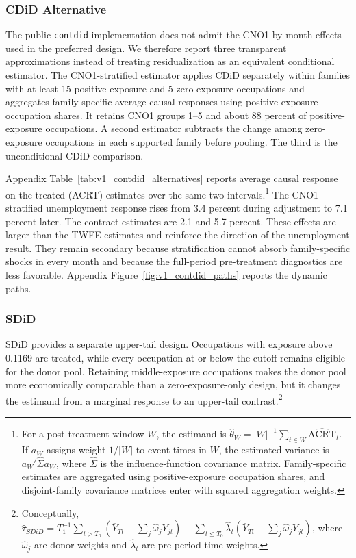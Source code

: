 \documentclass[11pt]{article}
\begin{document}
\subsubsection{CDiD Alternative}
\label{sec:v1_contdid}

The public \texttt{contdid} implementation does not admit the CNO1-by-month effects used in the preferred design. We therefore report three transparent approximations instead of treating residualization as an equivalent conditional estimator. The CNO1-stratified estimator applies CDiD separately within families with at least 15 positive-exposure and 5 zero-exposure occupations and aggregates family-specific average causal responses using positive-exposure occupation shares. It retains CNO1 groups 1--5 and about 88 percent of positive-exposure occupations. A second estimator subtracts the change among zero-exposure occupations in each supported family before pooling. The third is the unconditional CDiD comparison.

Appendix Table~\ref{tab:v1_contdid_alternatives} reports average causal response on the treated (ACRT) estimates over the same two intervals.\footnote{For a post-treatment window \(W\), the estimand is \(\widehat{\theta}_{W}=|W|^{-1}\sum_{t\in W}\widehat{\mathrm{ACRT}}_{t}\). If \(a_W\) assigns weight \(1/|W|\) to event times in \(W\), the estimated variance is \(a_W'\widehat{\Sigma}a_W\), where \(\widehat{\Sigma}\) is the influence-function covariance matrix. Family-specific estimates are aggregated using positive-exposure occupation shares, and disjoint-family covariance matrices enter with squared aggregation weights.} The CNO1-stratified unemployment response rises from 3.4 percent during adjustment to 7.1 percent later. The contract estimates are 2.1 and 5.7 percent. These effects are larger than the TWFE estimates and reinforce the direction of the unemployment result. They remain secondary because stratification cannot absorb family-specific shocks in every month and because the full-period pre-treatment diagnostics are less favorable. Appendix Figure~\ref{fig:v1_contdid_paths} reports the dynamic paths.

\subsubsection{SDiD}
\label{sec:v1_sdid}

SDiD provides a separate upper-tail design. Occupations with exposure above 0.1169 are treated, while every occupation at or below the cutoff remains eligible for the donor pool. Retaining middle-exposure occupations makes the donor pool more economically comparable than a zero-exposure-only design, but it changes the estimand from a marginal response to an upper-tail contrast.\footnote{Conceptually, \(\widehat{\tau}_{SDiD}=T_1^{-1}\sum_{t>T_0}\left(\overline{Y}_{Tt}-\sum_j\widehat{\omega}_jY_{jt}\right)-\sum_{t\leq T_0}\widehat{\lambda}_t\left(\overline{Y}_{Tt}-\sum_j\widehat{\omega}_jY_{jt}\right)\), where \(\widehat{\omega}_j\) are donor weights and \(\widehat{\lambda}_t\) are pre-period time weights.}
\end{document}
